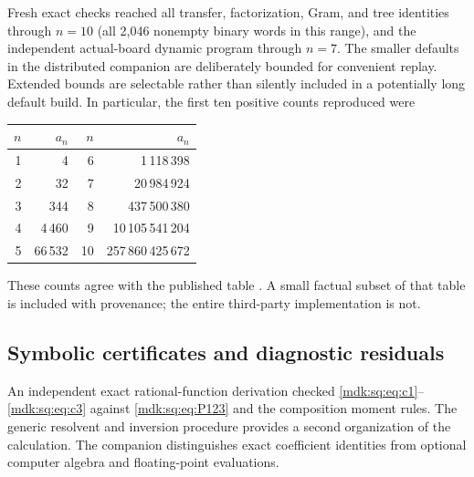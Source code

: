 \documentclass[11pt,letterpaper]{article}
\numberwithin{equation}{section}
\theoremstyle{remark}\newtheorem{remark}[theorem]{Remark}
\begin{document}
Fresh exact checks reached all transfer, factorization, Gram, and tree identities through $n=10$ (all 2,046 nonempty binary words in this range), and the independent actual-board dynamic program through $n=7$. The smaller defaults in the distributed companion are deliberately bounded for convenient replay. Extended bounds are selectable rather than silently included in a potentially long default build. In particular, the first ten positive counts reproduced were
\begin{center}\small
\begin{tabular}{r r@{\qquad}r r}
\toprule
$n$&$a_n$&$n$&$a_n$\\\midrule
1&4&6&1\,118\,398\\
2&32&7&20\,984\,924\\
3&344&8&437\,500\,380\\
4&4\,460&9&10\,105\,541\,204\\
5&66\,532&10&257\,860\,425\,672\\\bottomrule
\end{tabular}
\end{center}
These counts agree with the published table \cite{matsuoTable}. A small factual subset of that table is included with provenance; the entire third-party implementation is not.

\subsection{Symbolic certificates and diagnostic residuals}
An independent exact rational-function derivation checked \eqref{mdk:sq:eq:c1}--\eqref{mdk:sq:eq:c3} against \eqref{mdk:sq:eq:P123} and the composition moment rules. The generic resolvent and inversion procedure provides a second organization of the calculation. The companion distinguishes exact coefficient identities from optional computer algebra and floating-point evaluations.
\end{document}

